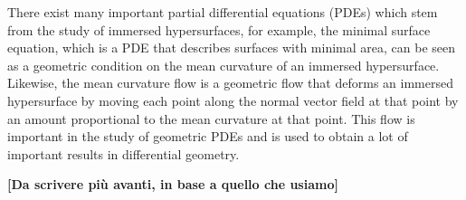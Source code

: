 

There exist many important partial differential equations (PDEs) which stem from the study of immersed hypersurfaces, for example, the minimal surface equation, which is a PDE that describes surfaces with minimal area, can be seen as a geometric condition on the mean curvature of an immersed hypersurface. Likewise, the mean curvature flow is a geometric flow that deforms an immersed hypersurface by moving each point along the normal vector field at that point by an amount proportional to the mean curvature at that point. This flow is important in the study of geometric PDEs and is used to obtain a lot of important results in differential geometry.







{\vspace{10pt}\LARGE \bf [Da scrivere più avanti, in base a quello che usiamo\LARGE]}



